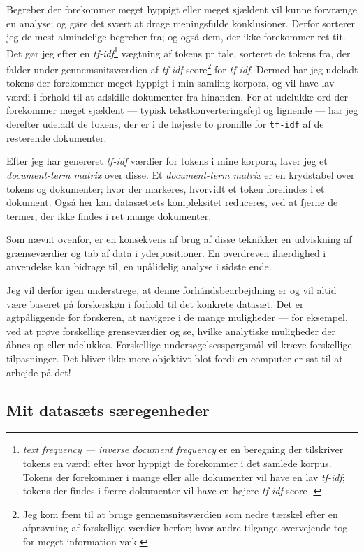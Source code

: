 Begreber der forekommer meget hyppigt eller meget sjældent vil kunne forvrænge en analyse; og gøre det svært at drage meningsfulde konklusioner.
Derfor sorterer jeg de mest almindelige begreber fra; og også dem, der ikke forekommer ret tit.
Det gør jeg efter en \textit{tf-idf}\footnote{\textit{text frequency — inverse document frequency} er en beregning der tilskriver tokens en værdi efter hvor hyppigt de forekommer i det samlede korpus.
Tokens der forekommer i mange eller alle dokumenter vil have en lav \textit{tf-idf}; tokens der findes i færre dokumenter vil have en højere \textit{tf-idf}-score \autocite[s. 29]{silgeTextMiningTidy2017}.} vægtning af tokens pr tale, sorteret de tokens fra, der falder under gennemsnitsværdien af \textit{tf-idf}-score\footnote{Jeg kom frem til at bruge gennemsnitsværdien som nedre tærskel efter en afprøvning af forskellige værdier herfor; hvor andre tilgange overvejende tog for meget information væk.} for \textit{tf-idf}.
Dermed har jeg udeladt tokens der forekommer meget hyppigt i min samling korpora, og vil have lav værdi i forhold til at adskille dokumenter fra hinanden.
For at udelukke ord der forekommer meget sjældent — typisk tekstkonverteringsfejl og lignende — har jeg derefter udeladt de tokens, der er i de højeste to promille for \texttt{tf-idf} af de resterende dokumenter.

Efter jeg har genereret \textit{tf-idf} værdier for tokens i mine korpora, laver jeg et \textit{document-term matrix} over disse.
Et \textit{document-term matrix} er en krydstabel over tokens og dokumenter; hvor der markeres, hvorvidt et token forefindes i et dokument.
Også her kan datasættets kompleksitet reduceres, ved at fjerne de termer, der ikke findes i ret mange dokumenter.

Som nævnt ovenfor, er en konsekvens af brug af disse teknikker en udviskning af grænseværdier og tab af data i yderpositioner.
En overdreven ihærdighed i anvendelse kan bidrage til, en upålidelig analyse i sidste ende.

Jeg vil derfor igen understrege, at denne forhándsbearbejdning er og vil altid være baseret på forskerskøn i forhold til det konkrete datasæt.
Det er agtpåliggende for forskeren, at navigere i de mange muligheder — for eksempel, ved at prøve forskellige grenseværdier og se, hvilke analytiske muligheder der åbnes op eller udelukkes.
Forskellige undersøgelsesspørgsmål vil kræve forskellige tilpasninger.
Det bliver ikke mere objektivt blot fordi en computer er sat til at arbejde på det!

\subsection{Mit datasæts særegenheder}

